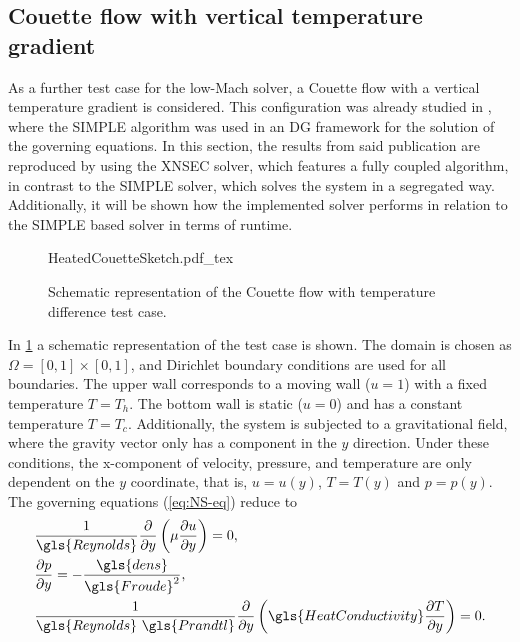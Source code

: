 \subsection{Couette flow with vertical temperature gradient} \label{ssec:CouetteFlowTempDiff}
As a further test case for the low-Mach solver, a Couette flow with a vertical temperature gradient is considered. This configuration was already studied in \textcite{kleinHighorderDiscontinuousGalerkin2016}, where the SIMPLE algorithm was used in an DG framework for the solution of the governing equations. In this section, the results from said publication are reproduced by using the XNSEC solver, which features a fully coupled algorithm, in contrast to the SIMPLE solver, which solves the system in a segregated way. Additionally, it will be shown how the implemented solver performs in relation to the SIMPLE based solver in terms of runtime.%
\begin{figure}[tb]
	\begin{center}
		\def\svgwidth{0.5\textwidth}
		{HeatedCouetteSketch.pdf_tex}
		\vspace{0.2cm}
		\caption{Schematic representation of the Couette flow with temperature difference test case.}\label{fig:CouetteTempDiff_scheme}
	\end{center}
\end{figure}%
In \cref{fig:CouetteTempDiff_scheme} a schematic representation of the test case is shown. The domain is chosen as $\Omega = [0,1]\times[0,1]$, and Dirichlet boundary conditions are used for all boundaries. The upper wall corresponds to a moving wall ($u = 1$) with a fixed temperature $T=T_h$. The bottom wall is static ($u = 0$) and has a constant temperature $T = T_c$.
Additionally, the system is subjected to a gravitational field, where the gravity vector only has a component in the $y$ direction. Under these conditions, the x-component of velocity, pressure, and temperature are only dependent on the $y$ coordinate, that is, $u = u(y)$, $T = T(y)$ and $p = p(y)$. The governing equations (\cref{eq:NS-eq}) reduce to%
\begin{subequations}
    \begin{align}
    	 & \frac{1}{\gls{Reynolds}} \pfrac{ }{y}\left(\mu\pfrac{u}{y}\right) = 0,\\
    	 & \pfrac{p}{y} = -\frac{\gls{dens}}{\gls{Froude}^2},\\
    	 & \frac{1}{\gls{Reynolds}~\gls{Prandtl}} \pfrac{ }{y}\left(\gls{HeatConductivity}\pfrac{T}{y}\right) = 0.
    \end{align}\label{eq:AllCouetteEquations}
\end{subequations}
